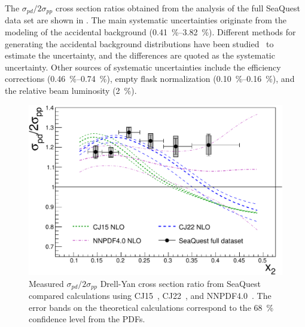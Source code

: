 \documentclass[reprint,aps,unsortedaddress,superscriptaddress,prl,floatfix,showpacs,linenumbers]{revtex4-2}
\begin{document}
The $\sigma_{pd}/2\sigma_{pp}$ cross 
section ratios obtained from the analysis of the full SeaQuest
data set are shown in . 
The main systematic uncertainties originate from the modeling of the
accidental background (\qtyrange{0.41}{3.82}{\percent}).
Different methods for generating the accidental background distributions
have been studied~\cite{pate2023} to estimate the uncertainty,
and the differences are quoted as the systematic uncertainty.
Other sources of systematic uncertainties include the efficiency
corrections (\qtyrange{0.46}{0.74}{\percent}),
empty flask normalization (\qtyrange{0.10}{0.16}{\percent}), and the
relative beam luminosity (\SI{2}{\percent}).

\begin{figure}[htbp!]
	\centering
	\includegraphics[width=\linewidth]{data_full_xT_syst.pdf}
	\caption{Measured $\sigma_{pd}/2\sigma_{pp}$ Drell-Yan cross section ratio from SeaQuest compared calculations using
		CJ15~\cite{accardi2016a}, CJ22~\cite{accardi2023}, and NNPDF4.0~\cite{ball2022a}.
		The error bands on the theoretical calculations correspond to the \SI{68}{\percent} confidence level from the PDFs.}
	\label{fig:xT_csr}
\end{figure}
\end{document}
